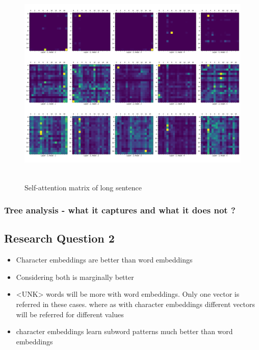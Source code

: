 \documentclass[a4paper, 11pt]{article}
\begin{document}
\begin{figure}[H]
    \centering
    \includegraphics[width=\textwidth,height=10cm,keepaspectratio=true]
    {self-attention-matrix-2.png}
    \caption{
        Self-attention matrix of long sentence
    }
    \label{fig:self-attention-matrix-large-sentence}
\end{figure}

\subsubsection{Tree analysis - what it captures and what it does not ?}

\subsection{Research Question 2}

\begin{itemize}
\item Character embeddings are better than word embeddings
\item Considering both is marginally better
\item <UNK> words will be more with word embeddings. Only one vector is referred in these cases. where as with character embeddings different vectors will be referred for different values
\item character embeddings learn subword patterns much better than word embeddings
\end{itemize}
\end{document}
